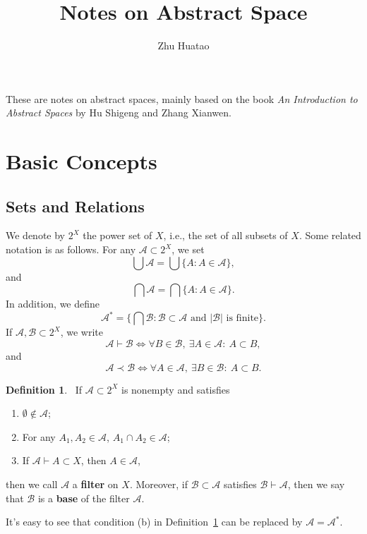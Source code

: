 \documentclass[12pt,a4paper,draft]{article}  %
\title{Notes on Abstract Space}
\date{\DTMnow}
\author{
    Zhu Huatao
}
\theoremstyle{definition}
\newtheorem{definition}{Definition}[section]
\numberwithin{equation}{section}
\begin{document}
\maketitle



These are notes on abstract spaces, mainly based on the book \textit{An Introduction to Abstract Spaces} by Hu Shigeng and Zhang Xianwen.

\section{Basic Concepts}

\subsection{Sets and Relations}

We denote by $2^X$ the power set of $X$, i.e., the set of all subsets of $X$. Some related notation is as follows. For any $\mathcal{A} \subset 2^X$, we set
$$ \bigcup \mathcal{A} = \bigcup\{A:A\in \mathcal{A}\}, $$
and
$$ \bigcap \mathcal{A} = \bigcap\{A:A\in \mathcal{A}\}. $$
In addition, we define
$$ \mathcal{A}^* = \{\bigcap \mathcal{B}: \mathcal{B} \subset \mathcal{A} \text{ and } |\mathcal{B}| \text{ is finite} \}.
$$
If $\mathcal{A},\mathcal{B} \subset 2^X$, we write
$$ \mathcal{A} \vdash \mathcal{B} \iff \forall B \in \mathcal{B},\ \exists A \in \mathcal{A}:\ A \subset B,$$
and
$$ \mathcal{A} \prec \mathcal{B} \iff \forall A \in \mathcal{A},\ \exists B \in \mathcal{B}:\ A \subset B.
$$

\begin{definition}~\label{def1.1}
    If $\mathcal{A} \subset 2^X$ is nonempty and satisfies
    \begin{enumerate}
        \item $\emptyset\notin \mathcal{A}$;
        \item For any $A_1,A_2 \in \mathcal{A}$, $A_1 \cap A_2 \in \mathcal{A}$;
        \item If $\mathcal{A} \vdash A \subset X$, then $A \in \mathcal{A}$,
    \end{enumerate}
    then we call $\mathcal{A}$ a \textbf{filter} on $X$. Moreover, 
    if $\mathcal{B} \subset \mathcal{A}$ satisfies $\mathcal{B} \vdash \mathcal{A}$, 
    then we say that $\mathcal{B}$ is a \textbf{base} of the filter $\mathcal{A}$.
\end{definition}
It's easy to see that condition (b) in Definition~\ref{def1.1} can be replaced by $\mathcal{A}=\mathcal{A}^*$.
\end{document}
